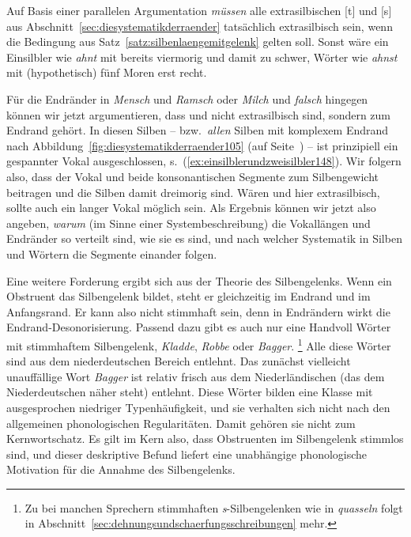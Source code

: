 Auf Basis einer parallelen Argumentation \textit{müssen} alle extrasilbischen [t] und [s] aus Abschnitt~\ref{sec:diesystematikderraender} tatsächlich extrasilbisch sein, wenn die Bedingung aus Satz~\ref{satz:silbenlaengemitgelenk} gelten soll.
Sonst wäre ein Einsilbler wie \textit{ahnt} mit \textipa{[Pa:nt]} bereits viermorig und damit zu schwer, Wörter wie \textit{ahnst} mit (hypothetisch) fünf Moren erst recht.

Für die Endränder in \textit{Mensch} und \textit{Ramsch} oder \textit{Milch} und \textit{falsch} hingegen können wir jetzt argumentieren, dass \textipa{[S]} und \textipa{[\c{c}]} nicht extrasilbisch sind, sondern zum Endrand gehört.
In diesen Silben -- bzw.\ \textit{allen} Silben mit komplexem Endrand nach Abbildung~\ref{fig:diesystematikderraender105} (auf Seite~\pageref{fig:diesystematikderraender105}) -- ist prinzipiell ein gespannter Vokal ausgeschlossen, s.\ (\ref{ex:einsilblerundzweisilbler148}).
Wir folgern also, dass der Vokal und beide konsonantischen Segmente zum Silbengewicht beitragen und die Silben damit dreimorig sind.
Wären \textipa{[S]} und \textipa{[\c{c}]} hier extrasilbisch, sollte auch ein langer Vokal möglich sein.
Als Ergebnis können wir jetzt also angeben, \textit{warum} (im Sinne einer Systembeschreibung) die Vokallängen und Endränder so verteilt sind, wie sie es sind, und nach welcher Systematik in Silben und Wörtern die Segmente einander folgen.

\begin{exe}
  \ex \label{ex:einsilblerundzweisilbler148}
  \begin{xlist}
    \ex[*]{\textipa{[mE:nS]}}
    \ex[*]{\textipa{[ra:mS]}}
    \ex[*]{\textipa{[mi:l\c{c}]}}
    \ex[*]{\textipa{[fa:lS]}}
  \end{xlist}
\end{exe}

\label{abs:einsilblerundzweisilbler149}
Eine weitere Forderung ergibt sich aus der Theorie des Silbengelenks.
Wenn ein Obstruent das Silbengelenk bildet, steht er gleichzeitig im Endrand und im Anfangsrand.
Er kann also nicht stimmhaft sein, denn in Endrändern wirkt die Endrand-Desonorisierung.
\label{abs:einsilblerundzweisilbler150}Passend dazu gibt es auch nur eine Handvoll Wörter mit stimmhaftem Silbengelenk, \zB \textit{Kladde}, \textit{Robbe} oder \textit{Bagger}.%
\footnote{Zu bei manchen Sprechern stimmhaften \textit{s}-Silbengelenken wie in \textit{quasseln} folgt in Abschnitt~\ref{sec:dehnungsundschaerfungsschreibungen} mehr.}
Alle diese Wörter sind aus dem niederdeutschen Bereich entlehnt.
Das zunächst vielleicht unauffällige Wort \textit{Bagger} ist relativ frisch aus dem Niederländischen (das dem Niederdeutschen näher steht) entlehnt.
Diese Wörter bilden eine Klasse mit ausgesprochen niedriger Typenhäufigkeit, und sie verhalten sich nicht nach den allgemeinen phonologischen Regularitäten.
Damit gehören sie nicht zum Kernwortschatz.
Es gilt im Kern also, dass Obstruenten im Silbengelenk stimmlos sind, und dieser deskriptive Befund liefert eine unabhängige phonologische Motivation für die Annahme des Silbengelenks.

